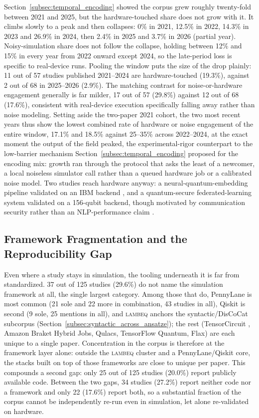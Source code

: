 \documentclass{ieeeaccess}
\begin{document}
Section~\ref{subsec:temporal_encoding} showed the corpus grew roughly twenty-fold between 2021 and 2025, but the hardware-touched share does not grow with it. It climbs slowly to a peak and then collapses: 0\% in 2021, 12.5\% in 2022, 14.3\% in 2023 and 26.9\% in 2024, then 2.4\% in 2025 and 3.7\% in 2026 (partial year). Noisy-simulation share does not follow the collapse, holding between 12\% and 15\% in every year from 2022 onward except 2024, so the late-period loss is specific to real-device runs. Pooling the window puts the size of the drop plainly: 11 out of 57 studies published 2021--2024 are hardware-touched (19.3\%), against 2 out of 68 in 2025--2026 (2.9\%). The matching contrast for noise-or-hardware engagement generally is far milder, 17 out of 57 (29.8\%) against 12 out of 68 (17.6\%), consistent with real-device execution specifically falling away rather than noise modeling. Setting aside the two-paper 2021 cohort, the two most recent years thus show the lowest combined rate of hardware or noise engagement of the entire window, 17.1\% and 18.5\% against 25--35\% across 2022--2024, at the exact moment the output of the field peaked, the experimental-rigor counterpart to the low-barrier mechanism Section~\ref{subsec:temporal_encoding} proposed for the encoding mix: growth ran through the protocol that asks the least of a newcomer, a local noiseless simulator call rather than a queued hardware job or a calibrated noise model. Two studies reach hardware anyway: a neural-quantum-embedding pipeline validated on an IBM backend \cite{baik_neural_2025}, and a quantum-secure federated-learning system validated on a 156-qubit backend, though motivated by communication security rather than an NLP-performance claim \cite{liu_experimentally_2026}.

\subsection{Framework Fragmentation and the Reproducibility Gap}
\label{subsec:reproducibility_gap}

Even where a study stays in simulation, the tooling underneath it is far from standardized. 37 out of 125 studies (29.6\%) do not name the simulation framework at all, the single largest category. Among those that do, PennyLane is most common (21 sole and 22 more in combination, 43 studies in all), Qiskit is second (9 sole, 25 mentions in all), and \textsc{lambeq} anchors the syntactic/DisCoCat subcorpus (Section~\ref{subsec:syntactic_across_ansatze}); the rest (TensorCircuit \cite{liu_hcqnsc_2026}, Amazon Braket Hybrid Jobs, Qulacs, TensorFlow Quantum, Flax) are each unique to a single paper. Concentration in the corpus is therefore at the framework layer alone: outside the \textsc{lambeq} cluster and a PennyLane/Qiskit core, the stacks built on top of those frameworks are close to unique per paper. This compounds a second gap: only 25 out of 125 studies (20.0\%) report publicly available code. Between the two gaps, 34 studies (27.2\%) report neither code nor a framework and only 22 (17.6\%) report both, so a substantial fraction of the corpus cannot be independently re-run even in simulation, let alone re-validated on hardware.
\end{document}
